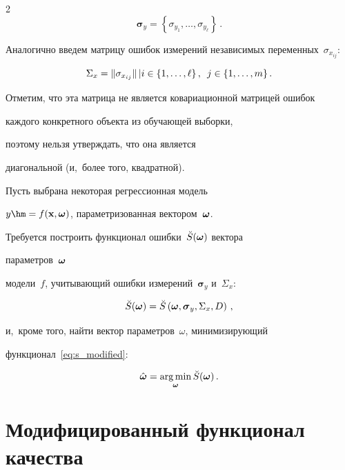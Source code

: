 \begin{multicols}{2}
$$

  \boldsymbol{\sigma}_y =\left \{ \sigma_{y_1}, \dots, \sigma_{y_{\ell}} \right\}\,.

$$



Аналогично введем матрицу ошибок измерений независимых переменных~$\sigma_{x_{ij}}$:

$$

  \Sigma_x = \| \sigma_{x_{ij}} \|\, | i \in \{ 1, \dots, \ell \}\,,\enskip j \in \{ 1, 

\dots, m \}\,.

$$

Отметим, что эта мат\-ри\-ца не является ковариационной мат\-ри\-цей ошибок

каждого конкретного объекта из обучающей выборки,

поэтому нельзя утверждать, что она является

диагональной (и,~более того, квадратной).



Пусть выбрана некоторая регрессионная модель

$y \hm= f (\mathbf{x}, \bomega)$, параметризованная вектором~$\boldsymbol{\omega}$.

Требуется построить функционал ошибки~$\breve{S}(\boldsymbol{\omega})$ вектора 

па\-ра\-мет\-ров~$\boldsymbol{\omega}$ 

модели~$f$, учитывающий ошибки измерений~$\boldsymbol{\sigma}_y$ и~$\Sigma_x$:

\begin{equation}

  \breve{S}(\bomega) = \breve{S}\left(\bomega, \boldsymbol{\sigma}_y, \Sigma_x, D\right)\,,

  \label{eq:s_modified}

\end{equation}

и,~кроме того, найти вектор па\-ра\-мет\-ров~$\omega$, минимизирующий 

функционал~\eqref{eq:s_modified}:

\begin{equation*}

  \hat{\bomega} = \mathop{\arg \min}\limits_{\bomega} \breve{S}(\bomega)\,.

\end{equation*}



\section{Модифицированный функционал качества}




\end{multicols}
